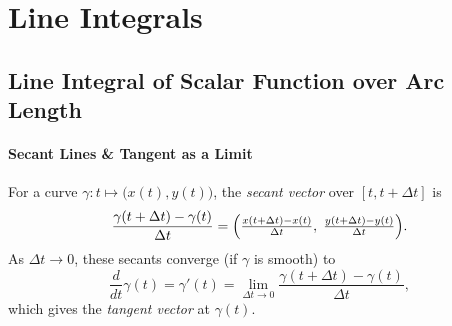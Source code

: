 \documentclass[11pt,openany]{article}
\begin{document}
\newpage
\section*{Line Integrals}
\subsection*{Line Integral of Scalar Function over Arc Length}

\paragraph{Secant Lines \&  Tangent as a Limit}
\begin{center}
	\endanimateinline
\end{center}
For a curve $\gamma\colon t\mapsto\bigl(x(t),y(t)\bigr)$, the \emph{secant vector} over $[t,t+\Delta t]$ is
\[
\frac{\gamma(t+\Delta t)-\gamma(t)}{\Delta t}
= \Bigl(\tfrac{x(t+\Delta t)-x(t)}{\Delta t},\;\tfrac{y(t+\Delta t)-y(t)}{\Delta t}\Bigr).
\]
As $\Delta t \to 0$, these secants converge (if $\gamma$ is smooth) to
\[
\frac{d}{dt}\gamma(t)=\gamma'(t)
= \lim_{\Delta t\to0}
\frac{\gamma(t+\Delta t)-\gamma(t)}{\Delta t},
\]
which gives the \emph{tangent vector} at $\gamma(t)$.
\end{document}
